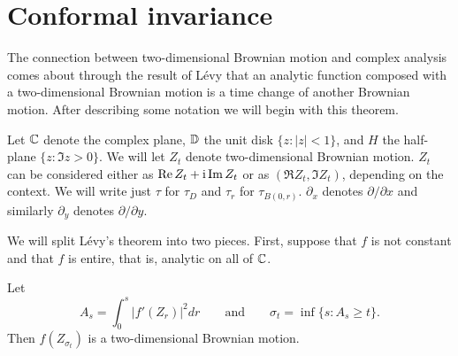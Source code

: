 \label{ch5}

\section{Conformal invariance}\label{ch5_sec1}


The connection between two-dimensional Brownian motion and complex analysis comes about through the result of L\'evy that an analytic function composed with a two-dimensional Brownian motion is a time change of another Brownian motion. After describing some notation we will begin with this theorem.

Let $\mathbb{C}$ denote the complex plane, $\mathbb{D}$ the unit disk $\{z : |z| < 1\}$, and $H$ the half-plane $\{z : \Im z > 0\}$. We will let $Z_t$ denote two-dimensional Brownian motion. $Z_t$ can be considered either as $\operatorname{Re} Z_t + \mathrm{i}\operatorname{Im} Z_t$ or as $(\Re Z_t, \Im Z_t)$, depending on the context. We will write just $\tau$ for $\tau_D$ and $\tau_r$ for $\tau_{B(0,r)}$. $\partial_x$ denotes $\partial/\partial x$ and similarly $\partial_y$ denotes $\partial/\partial y$.

We will split L\'evy's theorem into two pieces. First, suppose that $f$ is not constant and that $f$ is entire, that is, analytic on all of $\mathbb{C}$.

\begin{theorem}\label{thm:ch5_1.1}
Let
\begin{equation}\label{eq:ch5_1.1}
A_s = \int_0^s |f'(Z_r)|^2 dr \qquad \text{and} \qquad \sigma_t = \inf\{s : A_s \geq t\}.
\end{equation}
Then $f(Z_{\sigma_t})$ is a two-dimensional Brownian motion.
\end{theorem}

